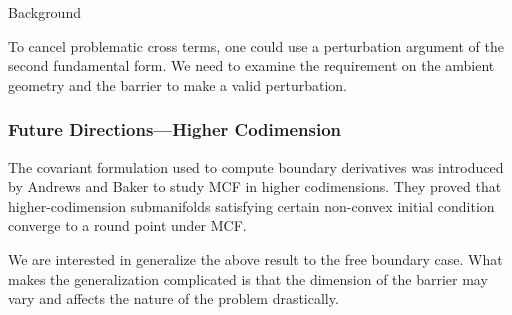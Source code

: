 \documentclass[pdf]{beamer}
\begin{document}
\begin{section}{Background}
\begin{frame}
        To cancel problematic cross terms, one could use a perturbation argument of the second fundamental form. We need to examine the requirement on the ambient geometry and the barrier to make a valid perturbation.
    \end{frame}

    \begin{frame}
        \frametitle{Future Directions---Higher Codimension}
        
        The covariant formulation used to compute boundary derivatives was introduced by Andrews and Baker to study MCF in higher codimensions. They proved that higher-codimension submanifolds satisfying certain non-convex initial condition converge to a round point under MCF.

        We are interested in generalize the above result to the free boundary case. What makes the generalization complicated is that the dimension of the barrier may vary and affects the nature of the problem drastically.
    \end{frame}
\end{section}
\end{document}
